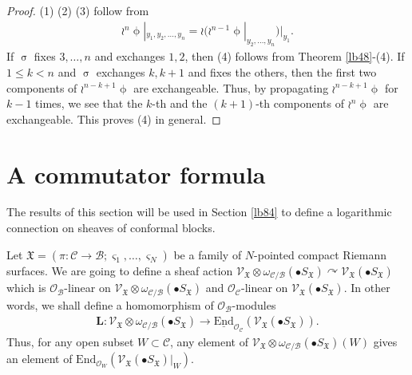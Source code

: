 \documentclass[12pt,a4paper,notitlepage]{report}
\theoremstyle{definition}
\theoremstyle{plain}
\newcommand{\fk}{\mathfrak}
\newcommand{\mc}{\mathcal}
\newcommand{\End}{\mathrm{End}} %
\newcommand{\scr}{\mathscr}
\newcommand{\sgm}{\varsigma}
\newcommand{\mbf}{\mathbf}
\newcommand{\blt}{\bullet}
\numberwithin{equation}{section}
\begin{document}
\begin{proof}
(1) (2) (3) follow from
\begin{align}
\wr^n\upphi|_{y_1,y_2,\dots,y_n}=\wr(\wr^{n-1}\upphi|_{y_2,\dots,y_n})|_{y_1}.
\end{align}
If $\upsigma$ fixes $3,\dots,n$ and exchanges $1,2$, then (4) follows from Theorem \ref{lb48}-(4). If $1\leq k<n$ and $\upsigma$ exchanges $k,k+1$ and fixes the others, then the first two components of $\wr^{n-k+1}\upphi$ are exchangeable. Thus, by propagating $\wr^{n-k+1}\upphi$ for $k-1$ times, we see that the $k$-th and the $(k+1)$-th components of $\wr^n\upphi$ are exchangeable. This proves (4) in general.
\end{proof}





\section{A commutator formula}

The results of this section will be used in Section \ref{lb84} to define a logarithmic connection on sheaves of conformal blocks.

Let $\fk X=(\pi:\mc C\rightarrow\mc B;\sgm_1,\dots,\sgm_N)$ be a family of $N$-pointed compact Riemann surfaces. We are going to define a sheaf action $\scr V_{\fk X}\otimes\omega_{\mc C/\mc B}(\blt S_{\fk X})\curvearrowright \scr V_{\fk X}(\blt S_{\fk X})$ which is $\scr O_{\mc B}$-linear on $\scr V_{\fk X}\otimes\omega_{\mc C/\mc B}(\blt S_{\fk X})$ and $\scr O_{\mc C}$-linear on $\scr V_{\fk X}(\blt S_{\fk X})$. In other words, we shall define a homomorphism of $\scr O_{\mc B}$-modules
\begin{align*}
\mbf L:\scr V_{\fk X}\otimes\omega_{\mc C/\mc B}(\blt S_{\fk X})\rightarrow\underline{\End}_{\scr O_{\mc C}}(\scr V_{\fk X}(\blt S_{\fk X})).
\end{align*}
Thus, for any open subset $W\subset\mc C$, any element of $\scr V_{\fk X}\otimes\omega_{\mc C/\mc B}(\blt S_{\fk X})(W)$ gives an element of $\End_{\scr O_W}(\scr V_{\fk X}(\blt S_{\fk X})|_W)$. 
\end{document}
